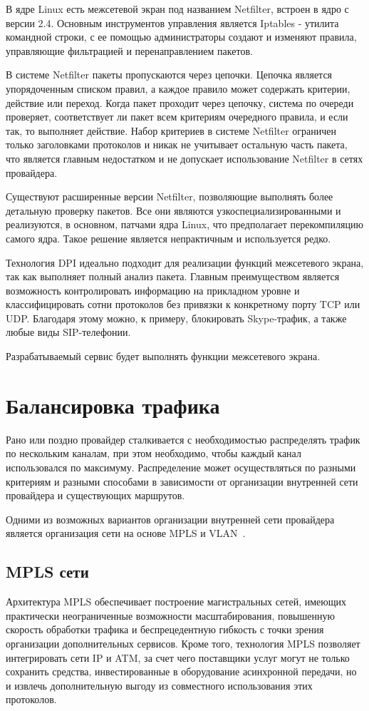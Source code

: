 В ядре Linux есть межсетевой экран под названием Netfilter, встроен в ядро с версии 2.4. Основным инструментов управления является Iptables - утилита командной строки, с ее помощью администраторы создают и изменяют правила, управляющие фильтрацией и перенаправлением пакетов.

В системе Netfilter пакеты пропускаются через цепочки. Цепочка является упорядоченным списком правил, а каждое правило может содержать критерии, действие или переход. Когда пакет проходит через цепочку, система по очереди проверяет, соответствует ли пакет всем критериям очередного правила, и если так, то выполняет действие. Набор критериев в системе Netfilter ограничен только заголовками протоколов и никак не учитывает остальную часть пакета, что является главным недостатком и не допускает использование Netfilter в сетях провайдера.

Существуют расширенные версии Netfilter, позволяющие выполнять более детальную проверку пакетов. Все они являются узкоспециализированными и реализуются, в основном, патчами ядра Linux, что предполагает перекомпиляцию самого ядра. Такое решение является непрактичным и используется редко.

Технология DPI идеально подходит для реализации функций межсетевого экрана, так как выполняет полный анализ пакета. Главным преимуществом является возможность контролировать информацию на прикладном уровне и классифицировать сотни протоколов без привязки к конкретному порту TCP или UDP. Благодаря этому можно, к примеру, блокировать Skype-трафик, а также любые виды SIP-телефонии.

Разрабатываемый сервис будет выполнять функции межсетевого экрана.


\section{Балансировка трафика}
Рано или поздно провайдер сталкивается с необходимостью распределять трафик по нескольким каналам, при этом необходимо, чтобы каждый канал использовался по максимуму. Распределение может осуществляться по разными критериям и разными способами в зависимости от организации внутренней сети провайдера и существующих маршрутов.

Одними из возможных вариантов организации внутренней сети провайдера является организация сети на основе MPLS и VLAN~\cite{modern_net}.

\subsection{MPLS сети}
Архитектура MPLS обеспечивает построение магистральных сетей, имеющих практически неограниченные возможности масштабирования, повышенную скорость обработки трафика и беспрецедентную гибкость с точки зрения организации дополнительных сервисов. Кроме того, технология MPLS позволяет интегрировать сети IP и ATM, за счет чего поставщики услуг могут не только сохранить средства, инвестированные в оборудование асинхронной передачи, но и извлечь дополнительную выгоду из совместного использования этих протоколов.

